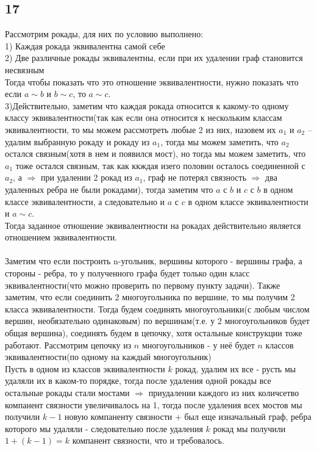 		\subsection{17}
		Рассмотрим рокады, для них по условию выполнено:\\
		1) Каждая рокада эквивалентна самой себе\\
		2) Две различные рокады эквивалентны, если при их удалении
		граф становится несвязным\\
		Тогда чтобы показать что это отношение эквивалентности, нужно показать что если $a \sim b$ и $b \sim c$, то $a \sim c$. \\
		3)Действительно, заметим что каждая рокада относится к какому-то одному классу эквивалентности(так как если она относится к нескольким классам эквивалентности, то мы можем рассмотреть любые 2 из них, назовем их $a_1$ и $a_2$ -- удалим выбранную рокаду и рокаду из $a_1$, тогда мы можем заметить, что $a_2$ остался связным(хотя в нем и появился мост), но тогда мы можем заметить, что $a_1$ тоже остался связным, так как ккждая изего половин осталось соединенной с $a_2$, а $\Longrightarrow$ при удалении 2 рокад из $a_1$, граф не потерял связность $\Longrightarrow$ два удаленных ребра не были рокадами), тогда заметим что $a$ с $b$ и $c$ с $b$ в одном классе эквивалентности, а следовательно и $a$ с $c$ в одном классе эквивалентности и $a \sim c$. \\
		Тогда заданное отношение эквивалентности на рокадах действительно является отношением эквивалентности. %
		\\ \\
		Заметим что если построить n-угольник, вершины которого - вершины графа, а стороны - ребра, то у полученного графа будет только один класс эквивалентности(что можно проверить по первому пункту задачи). Также заметим, что если соединить 2 многоугольника по вершине, то мы получим 2 класса эквивалентности. Тогда будем соединять многоугольники(с любым числом вершин, необязательно одинаковым) по вершинам(т.е. у 2 многоугольников будет общая вершина), соединять будем в цепочку, хотя остальные конструкции тоже работают. Рассмотрим цепочку из $n$ многоугольников - у неё будет $n$ классов эквивалентности(по одному на каждый многоугольник)
		\\
		Пусть в одном из классов эквивалентности $k$ рокад, удалим их все - русть мы удаляли их в каком-то порядке, тогда после удаления одной рокады все остальные рокады стали мостами $\Longrightarrow$ приудалении каждого из них количсетво компанент связности увеличивалось на 1, тогда после удаления всех мостов мы получили $k-1$ новую компаненту связности + был еще изначальный граф, ребра которого мы удаляли - следовательно после удаления $k$ рокад мы получили $1 + (k-1) = k$ компанент связности, что и требовалось.